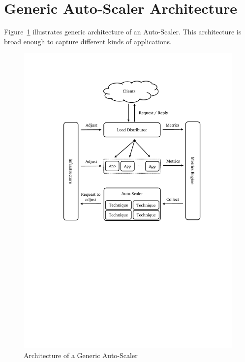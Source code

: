 \section{Generic Auto-Scaler Architecture}
\label{ias:arch}
Figure~\ref{fig:auto-scaler-arch} illustrates generic architecture of an Auto-Scaler. This architecture is broad enough to capture different kinds of applications.
\begin{figure}[!htbp]
    \centering
    \includegraphics[clip, trim=3cm 12.5cm 2.5cm 2.5cm, scale=0.8]{auto-scaler-arch.pdf}
    \caption{Architecture of a Generic Auto-Scaler}
    \label{fig:auto-scaler-arch}
\end{figure}

